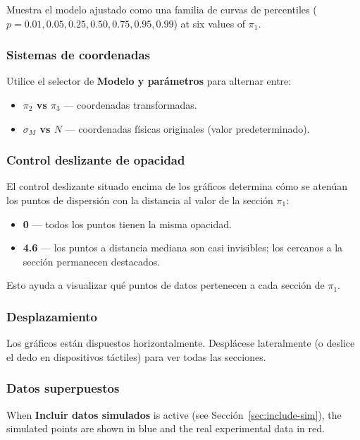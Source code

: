 \documentclass[11pt,a4paper]{article}
\newcommand{\piz}{\ensuremath{\pi_3}}
\newcommand{\pit}{\ensuremath{\pi_2}}
\newcommand{\pio}{\ensuremath{\pi_1}}
\newcommand{\sM}{\ensuremath{\sigma_M}}
\begin{document}
Muestra el modelo ajustado como una familia de curvas de percentiles ($p = 0.01, 0.05, 0.25, 0.50, 0.75, 0.95, 0.99$) at six values of $\pio$.

\subsubsection*{Sistemas de coordenadas}

Utilice el selector de \textbf{Modelo y parámetros} para alternar entre:
\begin{itemize}[leftmargin=1.4em]
  \item \textbf{$\pit$ vs $\piz$} --- coordenadas transformadas.
  \item \textbf{$\sM$ vs $N$} --- coordenadas físicas originales (valor predeterminado).
\end{itemize}

\subsubsection*{Control deslizante de opacidad}

El control deslizante situado encima de los gráficos determina cómo se atenúan los puntos de dispersión con la distancia al valor de la sección $\pio$:
\begin{itemize}[leftmargin=1.4em]
  \item \textbf{0} --- todos los puntos tienen la misma opacidad.
  \item \textbf{4.6} --- los puntos a distancia mediana son casi invisibles; los cercanos a la sección permanecen destacados.
\end{itemize}
Esto ayuda a visualizar qué puntos de datos pertenecen a cada sección de $\pio$.

\subsubsection*{Desplazamiento}

Los gráficos están dispuestos horizontalmente. Desplácese lateralmente (o deslice el dedo en dispositivos táctiles) para ver todas las secciones.

\subsubsection*{Datos superpuestos}

When \textbf{Incluir datos simulados} is active (see Sección~\ref{sec:include-sim}), the simulated points are shown in blue and the real experimental data in red.
\end{document}
